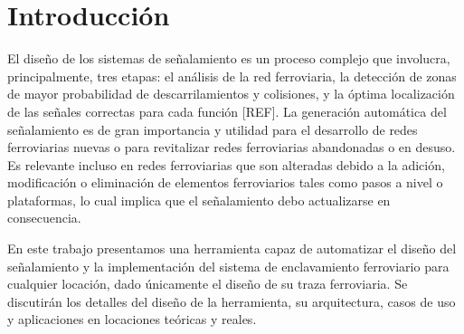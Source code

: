 \chapter{Introducción}

    El diseño de los sistemas de señalamiento es un proceso complejo que involucra, principalmente, tres etapas: el análisis de la red ferroviaria, la detección de zonas de mayor probabilidad de descarrilamientos y colisiones, y la óptima localización de las señales correctas para cada función [REF]. La generación automática del señalamiento es de gran importancia y utilidad para el desarrollo de redes ferroviarias nuevas o para revitalizar redes ferroviarias abandonadas o en desuso. Es relevante incluso en redes ferroviarias que son alteradas debido a la adición, modificación o eliminación de elementos ferroviarios tales como pasos a nivel o plataformas, lo cual implica que el señalamiento debo actualizarse en consecuencia.
    
    En este trabajo presentamos una herramienta capaz de automatizar el diseño del señalamiento y la implementación del sistema de enclavamiento ferroviario para cualquier locación, dado únicamente el diseño de su traza ferroviaria. Se discutirán los detalles del diseño de la herramienta, su arquitectura, casos de uso y aplicaciones en locaciones teóricas y reales.




